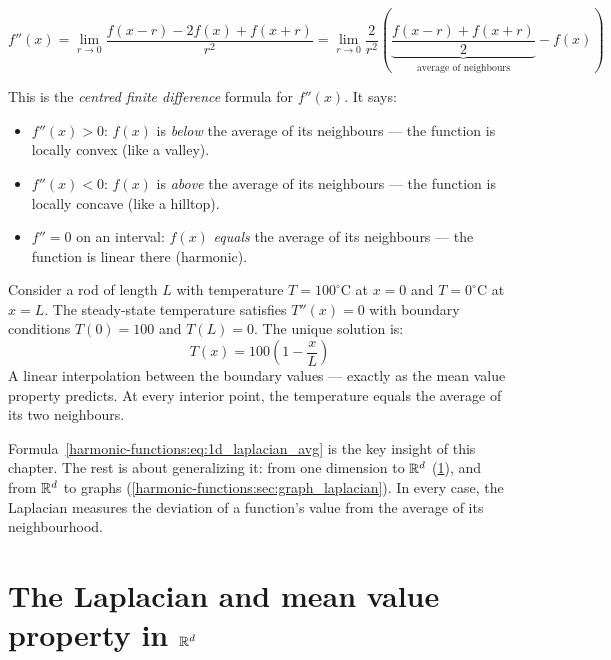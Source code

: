 \begin{notechapter}
\begin{equation}
\label{harmonic-functions:eq:1d_laplacian_avg}
f''(x) = \lim_{r \to 0} \frac{f(x-r) - 2f(x) + f(x+r)}{r^2}
= \lim_{r \to 0} \frac{2}{r^2}\left(
  \underbrace{\frac{f(x-r) + f(x+r)}{2}}_{\text{average of neighbours}}
  - f(x)\right)
\end{equation}

This is the \emph{centred finite difference} formula for $f''(x)$.
It says:
\begin{itemize}
    \item $f''(x) > 0$: $f(x)$ is \emph{below} the average of its
          neighbours --- the function is locally convex (like a valley).
    \item $f''(x) < 0$: $f(x)$ is \emph{above} the average of its
          neighbours --- the function is locally concave (like a hilltop).
    \item $f'' = 0$ on an interval: $f(x)$ \emph{equals} the average of its
          neighbours --- the function is linear there (harmonic).
\end{itemize}

\begin{example}
Consider a rod of length $L$ with temperature $T = 100^\circ$C at $x = 0$
and $T = 0^\circ$C at $x = L$. The steady-state temperature satisfies
$T''(x) = 0$ with boundary conditions $T(0) = 100$ and $T(L) = 0$. The
unique solution is:
\[
T(x) = 100\left(1 - \frac{x}{L}\right)
\]
A linear interpolation between the boundary values --- exactly as the mean
value property predicts. At every interior point, the temperature equals
the average of its two neighbours.
\end{example}

\begin{intuition}
Formula~\eqref{harmonic-functions:eq:1d_laplacian_avg} is the key insight of this chapter. The rest is about generalizing it: from one dimension to
$\mathbb{R}^d$ (\cref{harmonic-functions:sec:continuous}), and from $\mathbb{R}^d$ to graphs
(\cref{harmonic-functions:sec:graph_laplacian}). In every case, the Laplacian
measures the deviation of a function's value from the average of its
neighbourhood.
\end{intuition}


\section{The Laplacian and mean value property in \texorpdfstring{$\mathbb{R}^d$}{Rd}}
\label{harmonic-functions:sec:continuous}


\end{notechapter}
